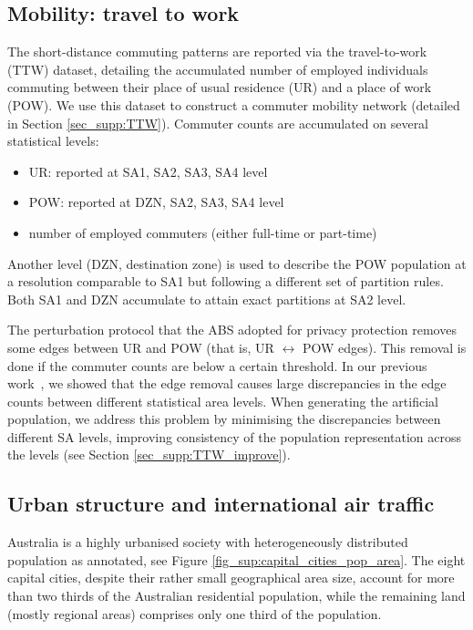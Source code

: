 \documentclass{article}
\begin{document}
\begin{appendices}
\subsection{Mobility: travel to work}

The short-distance commuting patterns are reported via the travel-to-work (TTW) dataset, detailing the accumulated number of employed individuals commuting between their place of usual residence (UR) and a place of work (POW). We use this dataset to construct a commuter mobility network (detailed in Section \ref{sec_supp:TTW}). Commuter counts are accumulated on several statistical levels:
\begin{itemize}
    \item UR: reported at SA1, SA2, SA3, SA4 level
    \item POW: reported at DZN, SA2, SA3, SA4 level
    \item number of employed commuters (either full-time or part-time)
\end{itemize}

Another level (DZN, destination zone) is used to describe the POW population at a resolution comparable to SA1 but following a different set of partition rules. Both SA1 and DZN accumulate to attain exact partitions at SA2 level.

The perturbation protocol that the ABS adopted for privacy protection removes some edges between UR and POW (that is, UR $\leftrightarrow$ POW edges). This removal is done if the commuter counts are below a certain threshold. In our previous work~\cite{fair_creating_2019}, we showed that the edge removal causes large discrepancies in the edge counts between different statistical area levels. When generating the artificial population, we address this problem by minimising the discrepancies between different SA levels, improving consistency of the population representation across the levels (see Section \ref{sec_supp:TTW_improve}). 

\subsection{Urban structure and international air traffic}
Australia is a highly urbanised society with heterogeneously distributed population as annotated, see Figure \ref{fig_sup:capital_cities_pop_area}. The eight capital cities, despite their rather small geographical area size, account for more than two thirds of the Australian residential population, while the remaining land (mostly regional areas) comprises only one third of the population.  


\end{appendices}
\end{document}
